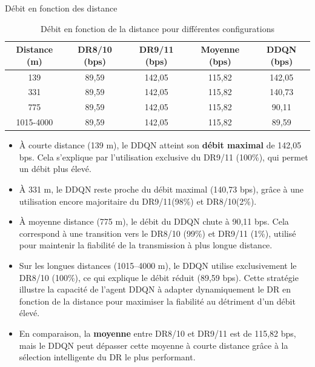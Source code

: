 \documentclass[aspectratio=169, 11pt]{beamer}
\begin{document}
\begin{frame}{Débit en fonction des distance}
	\begin{table}[H]
		\centering
		\caption{Débit en fonction de la distance pour différentes configurations}
		\label{tab:debit_distance}
		\begin{tabular}{|c|c|c|c|c|}
			\hline
			\rowcolor{blue!50}
			\color{white} \textbf{Distance (m)} & \color{white} \textbf{DR8/10 (bps)} & \color{white} \textbf{DR9/11 (bps)} & \color{white}  \textbf{Moyenne (bps)} & \color{white}\textbf{DDQN (bps)} \\
			\hline
			139    & 89,59  & 142,05 & 115,82 & 142,05 \\
			\hline
			331    & 89,59  & 142,05 & 115,82 & 140,73 \\
			\hline
			775    & 89,59  & 142,05 & 115,82 & 90,11 \\
			\hline
			1015-4000 & 89,59  & 142,05 & 115,82  & 89,59 \\
			\hline
		\end{tabular}
	\end{table}
\begin{itemize}
	
	\item À courte distance (139 m), le DDQN atteint son \textbf{débit maximal} de 142,05 bps. Cela s’explique par l’utilisation exclusive du DR9/11 (100\%), qui permet un débit plus élevé.
	
	\item À 331 m, le DDQN reste proche du débit maximal (140,73 bps), grâce à une utilisation encore majoritaire du DR9/11(98\%) et DR8/10(2\%).
	
	\item À moyenne distance (775 m), le débit du DDQN chute à 90,11 bps. Cela correspond à une transition vers le DR8/10 (99\%) et DR9/11 (1\%), utilisé pour maintenir la fiabilité de la transmission à plus longue distance.
	
	\item Sur les longues distances (1015–4000 m), le DDQN utilise exclusivement le DR8/10 (100\%), ce qui explique le débit réduit (89,59 bps). Cette stratégie illustre la capacité de l’agent DDQN à adapter dynamiquement le DR en fonction de la distance pour maximiser la fiabilité au détriment d'un débit élevé.
	
	\item En comparaison, la \textbf{moyenne} entre DR8/10 et DR9/11 est de 115,82 bps, mais le DDQN peut dépasser cette moyenne à courte distance grâce à la sélection intelligente du DR le plus performant.
\end{itemize}
\end{frame}
\end{document}

